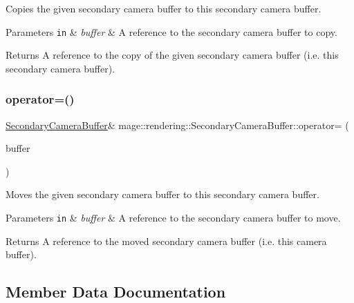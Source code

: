 Copies the given secondary camera buffer to this secondary camera buffer.


\begin{DoxyParams}[1]{Parameters}
\mbox{\tt in}  & {\em buffer} & A reference to the secondary camera buffer to copy. \\
\hline
\end{DoxyParams}
\begin{DoxyReturn}{Returns}
A reference to the copy of the given secondary camera buffer (i.\+e. this secondary camera buffer). 
\end{DoxyReturn}
\mbox{\label{structmage_1_1rendering_1_1_secondary_camera_buffer_ae559ef0e3a2c5e01963fa744a427cdc7}} 
\subsubsection{\texorpdfstring{operator=()}{operator=()}\hspace{0.1cm}{\footnotesize\ttfamily [2/2]}}
{\footnotesize\ttfamily \mbox{\hyperlink{structmage_1_1rendering_1_1_secondary_camera_buffer}{Secondary\+Camera\+Buffer}}\& mage\+::rendering\+::\+Secondary\+Camera\+Buffer\+::operator= (\begin{DoxyParamCaption}\item[{\mbox{\hyperlink{structmage_1_1rendering_1_1_secondary_camera_buffer}{Secondary\+Camera\+Buffer}} \&\&}]{buffer }\end{DoxyParamCaption})\hspace{0.3cm}{\ttfamily [default]}}

Moves the given secondary camera buffer to this secondary camera buffer.


\begin{DoxyParams}[1]{Parameters}
\mbox{\tt in}  & {\em buffer} & A reference to the secondary camera buffer to move. \\
\hline
\end{DoxyParams}
\begin{DoxyReturn}{Returns}
A reference to the moved secondary camera buffer (i.\+e. this camera buffer). 
\end{DoxyReturn}


\subsection{Member Data Documentation}
\mbox{\label{structmage_1_1rendering_1_1_secondary_camera_buffer_a05e3f20005a72a77017ecb76f683efdd}} 
